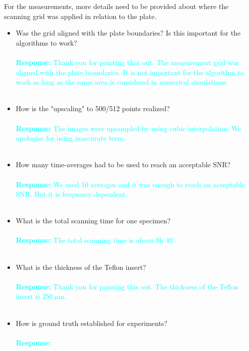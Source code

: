 \documentclass[11pt,a2paper]{report}
\begin{document}
	For the measurements, more details need to be provided about where the scanning grid was applied in relation to the plate. 
	\begin{itemize}
		\item Was the grid aligned with the plate boundaries? Is this important for the algorithms to work?
			\\ \\
		\textcolor{Cyan}{
			\textbf{Response:}
		Thank you for pointing that out. The measurement grid was aligned with the plate boundaries. It is not important for the algorithm to work as long as the same area is considered in numerical simulations.}
		\\ \\
		\item How is the "upscaling" to 500/512 points realized?
			\\ \\
		\textcolor{Cyan}{
			\textbf{Response:}
		The images were upsampled by using cubic interpolation.
	    We apologise for using inaccurate term.}
		\\ \\
		\item How many time-averages had to be used to reach an acceptable SNR?
			\\ \\
		\textcolor{Cyan}{
			\textbf{Response:}
		We used 10 averages and it was enough to reach an acceptable SNR.
	    But it is frequency dependent.}
		\\ \\
		\item What is the total scanning time for one specimen?
			\\ \\
		\textcolor{Cyan}{
			\textbf{Response:}
		The total scanning time is about 9h 40'.}
		\\ \\
		\item What is the thickness of the Teflon insert?
			\\ \\
		\textcolor{Cyan}{
			\textbf{Response:}
			Thank you for pointing this out.
		The thickness of the Teflon insert is \(250\ \mu\)m.
	    }
		\\ \\
		\item How is ground truth established for experiments?
			\\ \\
		\textcolor{Cyan}{
			\textbf{Response:}
}
\end{itemize}
\end{document}
